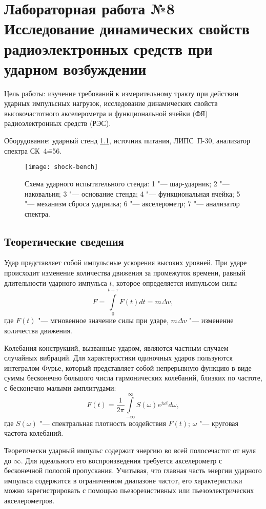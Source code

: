 \chapter{Лабораторная работа №8 \\
\Large Исследование динамических свойств радиоэлектронных средств при ударном возбуждении}

Цель работы: изучение требований к измерительному тракту при действии ударных импульсных нагрузок, исследование динамических свойств высокочастотного акселерометра и функциональной ячейки (ФЯ) радиоэлектронных средств (РЭС).

Оборудование: ударный стенд \ref{fig:shock-bench}, источник питания, ЛИПС~П-30, анализатор спектра СК~4\==56.

\begin{figure}[H]
    \centering
    \texttt{[image: shock-bench]}
    \caption{Схема ударного испытательного стенда:
        1 "--- шар-ударник;
        2 "--- наковальня;
        3 "--- основание стенда;
        4 "--- функциональная ячейка;
        5 "--- механизм сброса ударника;
        6 "--- акселерометр;
        7 "--- анализатор спектра.
    }
    \label{fig:shock-bench}
\end{figure}

\section{Теоретические сведения}

Удар представляет собой импульсные ускорения высоких уровней.
При ударе происходит изменение количества движения за промежуток времени, равный длительности ударного импульса $t$, которое определяется импульсом силы
\[
    F = \int \limits_0^{t+\tau} F(t) dt = m \Delta v,
\]
где $F(t)$ "--- мгновенное значение силы при ударе, $m \Delta v$ "--- изменение количества движения.

Колебания конструкций, вызванные ударом, являются частным случаем случайных вибраций.
Для характеристики одиночных ударов пользуются интегралом Фурье, который представляет собой непрерывную функцию в виде суммы бесконечно большого числа гармонических колебаний, близких по частоте, с бесконечно малыми амплитудами:
\[
    F(t) = \frac{1}{2 \pi} \int \limits_{-\infty}^{\infty} S(\omega) e^{j \omega t} d\omega,
\]
где $S(\omega)$ "--- спектральная плотность воздействия $F(t)$; $\omega$ "--- круговая частота колебаний.

Теоретически ударный импульс содержит энергию во всей полосечастот от нуля до $\infty$.
Для идеального его воспроизведения требуется акселерометр с бесконечной полосой пропускания.
Учитывая, что главная часть энергии ударного импульса содержится в ограниченном диапазоне частот, его характеристики можно зарегистрировать с помощью пьезорезистивных или пьезоэлектрических акселерометров.


